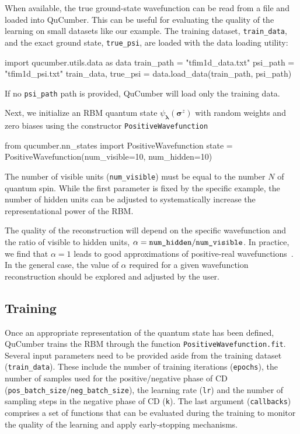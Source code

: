 \documentclass[submission, Phys, hidelnks]{SciPost}
\begin{document}
When available, the true ground-state wavefunction can be read from a file and loaded into QuCumber. This can be useful for evaluating the quality of the learning on small datasets like our example.
The training dataset, \verb|train_data|, and the exact ground state, \verb|true_psi|, are loaded with the data loading utility:
\begin{python}
import qucumber.utils.data as data
train_path = "tfim1d_data.txt"
psi_path = "tfim1d_psi.txt"
train_data, true_psi = data.load_data(train_path, psi_path)
\end{python}
If no \verb|psi_path| path is provided, QuCumber will load only the training data. 

Next, we initialize an RBM quantum state $\psi_{\bm{\lambda}}(\bm{\sigma}^z)$ with random weights and zero biases using the constructor \verb|PositiveWavefunction|
\begin{python}
from qucumber.nn_states import PositiveWavefunction
state = PositiveWavefunction(num_visible=10, num_hidden=10)
\end{python}
The number of visible units (\verb|num_visible|) must be equal to the number $N$ of quantum spin. While the first parameter is fixed by the specific example, the number of hidden units can be adjusted to systematically increase the representational power of the RBM. 

The quality of the reconstruction will depend on the specific wavefunction and the ratio of visible to hidden units, $\alpha = \verb|num_hidden|/\verb|num_visible|$.
In practice, we find that $\alpha = 1$ leads to good approximations of positive-real wavefunctions~\cite{Torlai2016thermo}.
In the general case, the value of $\alpha$ required for a given wavefunction reconstruction should be explored and adjusted by the user.


\subsection{Training}
Once an appropriate representation of the quantum state has been defined, QuCumber trains the RBM through the function \verb|PositiveWavefunction.fit|. Several input parameters need to be provided aside from the training dataset (\verb|train_data|). These include the number of training iterations (\verb|epochs|), the number of samples used for the positive/negative phase of CD (\verb|pos_batch_size|/\verb|neg_batch_size|), the learning rate (\verb|lr|) and the number of sampling steps in the negative phase of CD (\verb|k|). The last argument (\verb|callbacks|) comprises a set of functions that can be evaluated during the training to monitor the quality of the learning and apply early-stopping mechanisms. 
\end{document}
